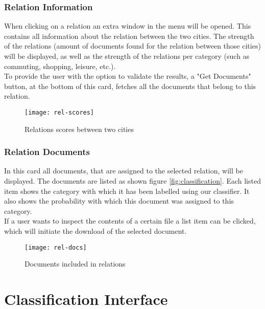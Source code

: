 \subsubsection{Relation Information}\label{sec:rel-info}

When clicking on a relation an extra window in the menu will be opened. This contains all information about the relation between the two cities. The strength of the relations (amount of documents found for the relation between those cities) will be displayed, as well as the strength of the relations per category (such as commuting, shopping, leisure, etc.).\\
To provide the user with the option to validate the results, a "Get Documents" button, at the bottom of this card, fetches all the documents that belong to this relation.


\begin{figure}[H]
    \centering
    \texttt{[image: rel-scores]}
    \caption{Relations scores between two cities}
    \label{fig:rel-scores}
\end{figure}

\subsubsection{Relation Documents}\label{sec:rel-docs}

In this card all documents, that are assigned to the selected relation, will be displayed. The documents are listed as shown figure \ref{fig:classification}. Each listed item shows the category with which it has been labelled using our classifier. It also shows the probability with which this document was assigned to this category.\\
If a user wants to inspect the contents of a certain file a list item can be clicked, which will initiate the download of the selected document.

\begin{figure}[H]
    \centering
    \texttt{[image: rel-docs]}
    \caption{Documents included in relations}
    \label{fig:rel-docs}
\end{figure}


\section{Classification Interface}

